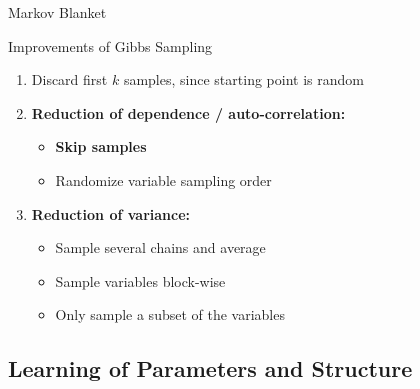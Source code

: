 \begin{frame}{Markov Blanket}{}
\end{frame}


\begin{frame}{Improvements of Gibbs Sampling}{}
	\begin{enumerate}
		\item {} Discard first $k$ samples, since starting point is random
		\item \textbf{Reduction of dependence / auto-correlation:}
		\begin{itemize}
			\item \textbf{Skip samples}
			\item Randomize variable sampling order
		\end{itemize}
		\item \textbf{Reduction of variance:}
		\begin{itemize}
			\item Sample several chains and average
			\item {} Sample variables block-wise
			\item {} Only sample a subset of the variables
		\end{itemize}
	\end{enumerate}
\end{frame}


\subsection{Learning of Parameters and Structure}

